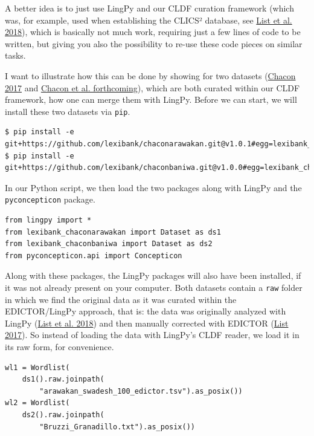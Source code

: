 \documentclass[
  english,
  a4paper,
  oneside,tablecaptionabove
]{scrbook}
\newcommand{\passthrough}[1]{#1}
\begin{document}
A better idea is to just use LingPy and our CLDF curation framework
\protect\hypertarget{more-1668}{}{} (which was, for example, used when
establishing the CLICS² database, see
\href{http://bibliography.lingpy.org?key=List2018f}{List et al. 2018}),
which is basically not much work, requiring just a few lines of code to
be written, but giving you also the possibility to re-use these code
pieces on similar tasks.

I want to illustrate how this can be done by showing for two datasets
(\href{http://bibliography.lingpy.org?key=Chacon2017}{Chacon 2017} and
\href{///home/mattis/projects/blogposts/calc-7-merging/Chacon2018}{Chacon
et al. forthcoming}), which are both curated within our CLDF framework,
how one can merge them with LingPy. Before we can start, we will install
these two datasets via \passthrough{\lstinline!pip!}.

\begin{lstlisting}
$ pip install -e git+https://github.com/lexibank/chaconarawakan.git@v1.0.1#egg=lexibank_chaconarawakan
$ pip install -e git+https://github.com/lexibank/chaconbaniwa.git@v1.0.0#egg=lexibank_chaconbaniwa
\end{lstlisting}

In our Python script, we then load the two packages along with LingPy
and the \passthrough{\lstinline!pyconcepticon!} package.

\begin{lstlisting}
from lingpy import *
from lexibank_chaconarawakan import Dataset as ds1
from lexibank_chaconbaniwa import Dataset as ds2
from pyconcepticon.api import Concepticon
\end{lstlisting}

\leavevmode\hypertarget{markdown}{}%
Along with these packages, the LingPy packages will also have been
installed, if it was not already present on your computer. Both datasets
contain a \passthrough{\lstinline!raw!} folder in which we find the
original data as it was curated within the EDICTOR/LingPy approach, that
is: the data was originally analyzed with LingPy (\href{http://bibliography.lingpy.org?key=List2018i}{List et al. 2018})
and then manually corrected with EDICTOR (\href{http://bibliography.lingpy.org?key=List2017d}{List 2017}). So
instead of loading the data with LingPy's CLDF reader, we load it in its
raw form, for convenience.

\begin{lstlisting}
wl1 = Wordlist(
    ds1().raw.joinpath(
        "arawakan_swadesh_100_edictor.tsv").as_posix()) 
wl2 = Wordlist(
    ds2().raw.joinpath(
        "Bruzzi_Granadillo.txt").as_posix())
\end{lstlisting}
\end{document}
